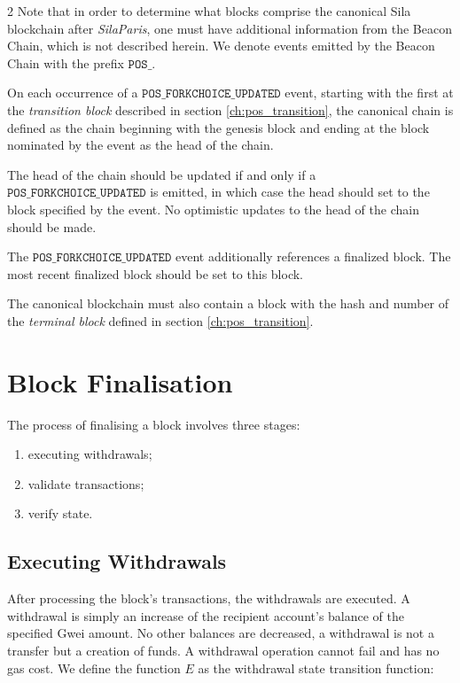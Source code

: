 \documentclass[9pt,oneside]{amsart}
\begin{document}
\begin{multicols}{2}
Note that in order to determine what blocks comprise the canonical Sila blockchain after \textit{SilaParis}, one must have additional information from the Beacon Chain, which is not described herein. We denote events emitted by the Beacon Chain with the prefix $\mathtt{POS\_}$.

On each occurrence of a $\mathtt{POS\_FORKCHOICE\_UPDATED}$ event, starting with the first at the \textit{transition block} described in section \ref{ch:pos_transition}, the canonical chain is defined as the chain beginning with the genesis block and ending at the block nominated by the event as the head of the chain.

The head of the chain should be updated if and only if a $\mathtt{POS\_FORKCHOICE\_UPDATED}$ is emitted, in which case the head should set to the block specified by the event.
No optimistic updates to the head of the chain should be made.

The $\mathtt{POS\_FORKCHOICE\_UPDATED}$ event additionally references a finalized block.
The most recent finalized block should be set to this block.

The canonical blockchain must also contain a block with the hash and number of the \textit{terminal block} defined in section \ref{ch:pos_transition}.

\section{Block Finalisation} \label{ch:finalisation}

The process of finalising a block involves three stages:

\begin{enumerate}
\item executing withdrawals;
\item validate transactions;
\item verify state.
\end{enumerate}

\subsection{Executing Withdrawals}
After processing the block's transactions, the withdrawals are executed. A withdrawal is simply an increase of the recipient account's balance of the specified Gwei amount. No other balances are decreased, a withdrawal is not a transfer but a creation of funds.
A withdrawal operation cannot fail and has no gas cost. We define the function $E$ as the withdrawal state transition function:


\end{multicols}
\end{document}
